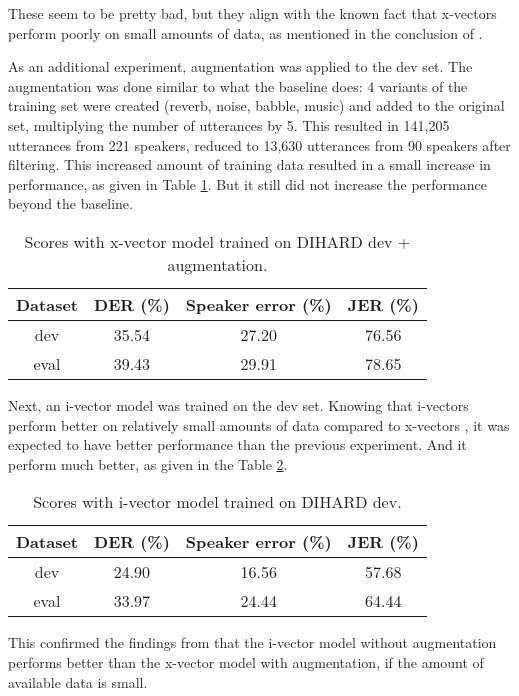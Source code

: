		These seem to be pretty bad, but they align with the known fact that x-vectors perform poorly on small amounts of data, as mentioned in the conclusion of \cite{huang2018jhu}.
		
		As an additional experiment, augmentation was applied to the dev set. The augmentation was done similar to what the baseline does: 4 variants of the training set were created (reverb, noise, babble, music) and added to the original set, multiplying the number of utterances by 5. This resulted in 141,205 utterances from 221 speakers, reduced to 13,630 utterances from 90 speakers after filtering. This increased amount of training data resulted in a small increase in performance, as given in Table \ref{table-dev-xvec-aug}. But it still did not increase the performance beyond the baseline.
		
		\begin{table}[h]
			\centering
			\begin{tabular}{|c|c|c|c|}
				\hline
				Dataset & DER (\%) & Speaker error (\%) & JER (\%) \\
				\hline
				dev & 35.54 & 27.20 & 76.56 \\
				\hline
				eval & 39.43 & 29.91 & 78.65 \\
				\hline
			\end{tabular}
			\caption{Scores with x-vector model trained on DIHARD dev + augmentation.}
			\label{table-dev-xvec-aug}
		\end{table}
	
		Next, an i-vector model was trained on the dev set. Knowing that i-vectors perform better on relatively small amounts of data compared to x-vectors \cite{huang2018jhu}, it was expected to have better performance than the previous experiment. And it perform much better, as given in the Table \ref{table-dev-ivec}.
		
		\begin{table}[h]
			\centering
			\begin{tabular}{|c|c|c|c|}
				\hline
				Dataset & DER (\%) & Speaker error (\%) & JER (\%) \\
				\hline
				dev & 24.90 & 16.56 & 57.68 \\
				\hline
				eval & 33.97 & 24.44 & 64.44 \\
				\hline
			\end{tabular}
			\caption{Scores with i-vector model trained on DIHARD dev.}
			\label{table-dev-ivec}
		\end{table}
		
		This confirmed the findings from \cite{huang2018jhu} that the i-vector model without augmentation performs better than the x-vector model with augmentation, if the amount of available data is small.
		
